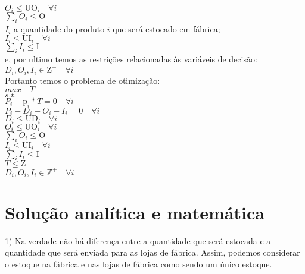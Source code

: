 \documentclass{book}
\begin{document}
$O_i \leq \textrm{UO}_i \quad \forall i$\\

$\sum_i{O_i} \leq \textrm{O}$ \\

$I_i$ a quantidade do produto $i$ que será estocado em fábrica; \\

$I_i \leq \textrm{UI}_i \quad \forall i$\\

$\sum_i{I_i} \leq \textrm{I}$ \\

e, por ultimo temos as restrições relacionadas às variáveis de decisão: \\

$D_i, O_i, I_i \in \textrm{Z}^+ \quad \forall i $ \\


Portanto temos o problema de otimização: \\


$max \quad T$ \\

$s.t.$ \\

$P_i - \textrm{p}_i * T  = 0 \quad \forall i$ \\

$P_i - D_i - O_i - I_i = 0 \quad \forall i$ \\

$D_i \leq \textrm{UD}_i \quad \forall i$ \\

$O_i \leq \textrm{UO}_i \quad \forall i$ \\

$\sum_i{O_i} \leq \textrm{O}$ \\

$I_i \leq \textrm{UI}_i \quad \forall i$ \\

$\sum_i{I_i} \leq \textrm{I}$ \\

$T \leq \textrm{Z}$ \\

$D_i, O_i, I_i \in  \mathbb{Z}^+ \quad \forall i$


\section{Solução analítica e matemática}

1) Na verdade não há diferença entre a quantidade que será estocada e a quantidade que será enviada para as lojas de fábrica. Assim, podemos considerar o estoque na fábrica e nas lojas de fábrica como sendo um único estoque. \\
\end{document}
